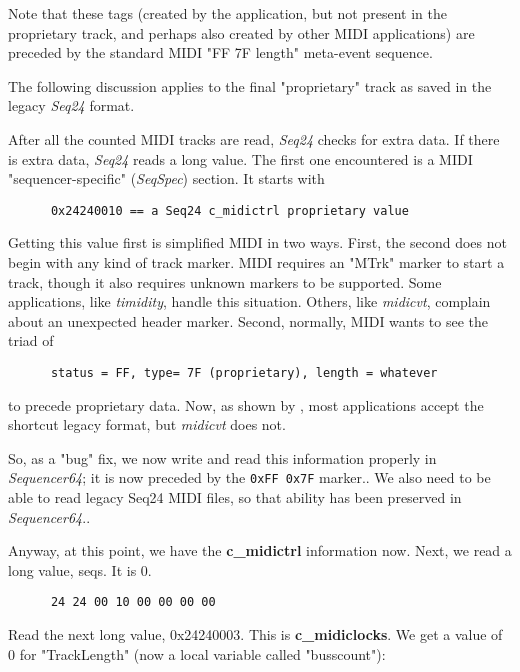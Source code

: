    Note that these tags (created by the application, but not present in the
   proprietary track, and perhaps also created by other MIDI applications) are
   preceded by the standard MIDI "FF 7F length" meta-event sequence.

   The following discussion applies to the final "proprietary" track as
   saved in the legacy \textsl{Seq24} format.

   After all the counted MIDI tracks are read, \textsl{Seq24} checks for
   extra data.  If there is extra data, \textsl{Seq24} reads a long value.
   The first one encountered is a MIDI "sequencer-specific"
   (\textsl{SeqSpec}) section.  It starts with

   \begin{verbatim}
      0x24240010 == a Seq24 c_midictrl proprietary value
   \end{verbatim}

   Getting this value first is simplified MIDI in two ways.
   First, the second does not begin with any kind of track marker.  MIDI
   requires an "MTrk" marker to start a track, though it also requires
   unknown markers to be supported.  Some applications, like
   \textsl{timidity}, handle this situation.  Others, like \textsl{midicvt},
   complain about an unexpected header marker.
   Second, normally, MIDI wants to see the triad of

   \begin{verbatim}
      status = FF, type= 7F (proprietary), length = whatever
   \end{verbatim}

   to precede proprietary data.
   Now, as shown by ,
   most applications accept the shortcut legacy format, but \textsl{midicvt}
   does not.

   So, as a "bug" fix, we now write and read
   this information properly in \textsl{Sequencer64}; it is now
   preceded by the \texttt{0xFF 0x7F} marker..
   We also need to be able to read legacy Seq24 MIDI files, so that ability has
   been preserved in \textsl{Sequencer64}..

   Anyway, at this point, we have the \textbf{c\_midictrl} information now.
   Next, we read a long value, seqs.  It is 0.

   \begin{verbatim}
      24 24 00 10 00 00 00 00
   \end{verbatim}

   Read the next long value, 0x24240003.  This is \textbf{c\_midiclocks}.
   We get a value of 0 for "TrackLength" (now a local variable called
   "busscount"):

